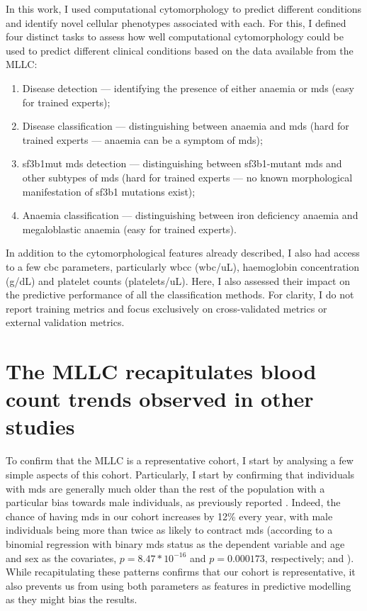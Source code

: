 In this work, I used computational cytomorphology to predict different conditions and identify novel cellular phenotypes associated with each. For this, I defined four distinct tasks to assess how well computational cytomorphology could be used to predict different clinical conditions based on the data available from the MLLC:

\begin{enumerate}
    \item Disease detection --- identifying the presence of either anaemia or \ac{mds} (easy for trained experts);
    \item Disease classification --- distinguishing between anaemia and \ac{mds} (hard for trained experts --- anaemia can be a symptom of \ac{mds});
    \item \ac{sf3b1}mut \ac{mds} detection --- distinguishing between \ac{sf3b1}-mutant \ac{mds} and other subtypes of \ac{mds} (hard for trained experts --- no known morphological manifestation of \ac{sf3b1} mutations exist);
    \item Anaemia classification --- distinguishing between iron deficiency anaemia and megaloblastic anaemia (easy for trained experts).
\end{enumerate}

In addition to the cytomorphological features already described, I also had access to a few \ac{cbc} parameters, particularly \ac{wbcc} (\ac{wbc}/uL), haemoglobin concentration (g/dL) and platelet counts (platelets/uL). Here, I also assessed their impact on the predictive performance of all the classification methods. For clarity, I do not report training metrics and focus exclusively on cross-validated metrics or external validation metrics.

\section{The MLLC recapitulates blood count trends observed in other studies}

To confirm that the MLLC is a representative cohort, I start by analysing a few simple aspects of this cohort. Particularly, I start by confirming that individuals with \ac{mds} are generally much older than the rest of the population with a particular bias towards male individuals, as previously reported \cite{Rollison2008-yg}. Indeed, the chance of having \ac{mds} in our cohort increases by 12\% every year, with male individuals being more than twice as likely to contract \ac{mds} (according to a binomial regression with binary \ac{mds} status as the dependent variable and age and sex as the covariates, $p=8.47*10^{-16}$ and $p=0.000173$, respectively;  and ). While recapitulating these patterns confirms that our cohort is representative, it also prevents us from using both parameters as features in predictive modelling as they might bias the results.

